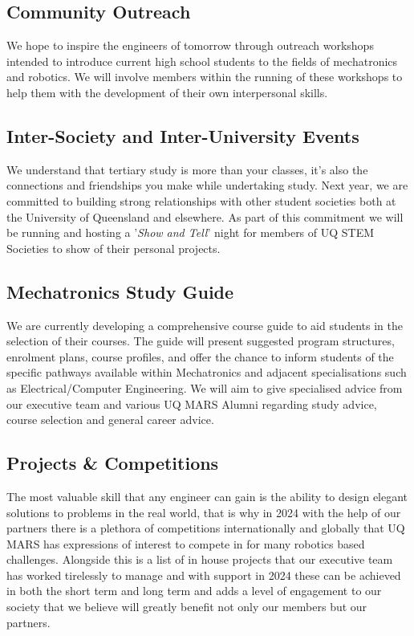 \documentclass[a4paper,12pt]{report}
\begin{document}
\subsection*{Community Outreach}
We hope to inspire the engineers of tomorrow through outreach workshops intended to introduce current high school students to the fields of mechatronics and robotics.
We will involve members within the running of these workshops to help them with the development of their own interpersonal skills.

\subsection*{Inter-Society and Inter-University Events}
We understand that tertiary study is more than your classes, it's also the connections and friendships you make while undertaking study.
Next year, we are committed to building strong relationships with other student societies both at the University of Queensland and elsewhere.
As part of this commitment we will be running and hosting a '\textit{Show and Tell}' night for members of UQ STEM Societies to show of their personal projects.

\subsection*{Mechatronics Study Guide}
We are currently developing a comprehensive course guide to aid students in the selection of their courses.
The guide will present suggested program structures, enrolment plans, course profiles, and offer the chance to inform students of the specific pathways available within Mechatronics and adjacent specialisations such as Electrical/Computer Engineering.
We will aim to give specialised advice from our executive team and various UQ MARS Alumni regarding study advice, course selection and general career advice.

\subsection*{Projects \& Competitions}
The most valuable skill that any engineer can gain is the ability to design elegant solutions to problems in the real world, that is why in 2024 with the help of our partners there is a plethora of competitions internationally and globally that UQ MARS has expressions of interest to compete in for many robotics based challenges. Alongside this is a list of in house projects that our executive team has worked tirelessly to manage and with support in 2024 these can be achieved in both the short term and long term and adds a level of engagement to our society that we believe will greatly benefit not only our members but our partners.
\end{document}

